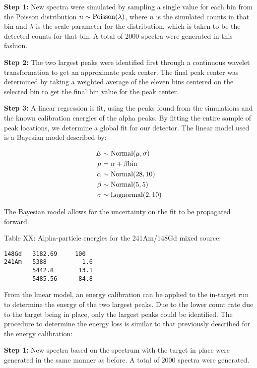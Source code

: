 \textbf{Step 1:}
  New spectra were simulated by sampling a single value for each bin
  from the Poisson distribution $n \sim \rm{Poisson}(\lambda)$,
  where $n$ is the simulated counts in that bin and $\lambda$ is the scale
  parameter for the distribution, which is taken to be the detected
  counts for that bin. A total of 2000 spectra were generated in this
  fashion.

\textbf{Step 2:}
  The two largest peaks were identified first through a continuous
  wavelet transformation to get an approximate peak center. The final
  peak center was determined by taking a weighted average of the eleven
  bins centered on the selected bin to get the final bin value for the
  peak center.

\textbf{Step 3:}
  A linear regression is fit, using the peaks found from the simulations
  and the known calibration energies of the alpha peaks. By fitting the
  entire sample of peak locations, we determine a global fit for our
  detector. The linear model used is a Bayesian model described by:

\begin{align*}
    E &\sim \rm{Normal}(\mu, \sigma) \\
    \mu &= \alpha + \beta \rm{bin} \\
    \alpha &\sim \rm{Normal}(28, 10) \\
    \beta &\sim \rm{Normal}(5, 5) \\
    \sigma &\sim \rm{Lognormal}(2, 10)
\end{align*}

  The Bayesian model allows for the uncertainty on the fit to be
  propagated forward.

Table XX: Alpha-particle energies for the 241Am/148Gd mixed source:

\begin{verbatim}
148Gd   3182.69     100
241Am   5388          1.6
        5442.8       13.1
        5485.56      84.8
\end{verbatim}

From the linear model, an energy calibration can be applied to the
in-target run to determine the energy of the two largest peaks. Due to
the lower count rate due to the target being in place, only the largest
peaks could be identified. The procedure to determine the energy loss is
similar to that previously described for the energy calibration:

\textbf{Step 1:}
  New spectra based on the spectrum with the target in place were
  generated in the same manner as before. A total of 2000 spectra were
  generated.

